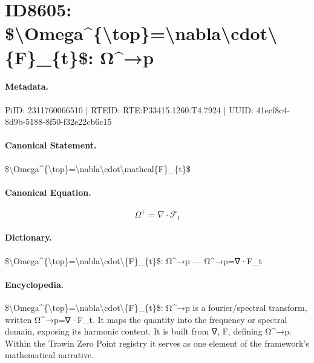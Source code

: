 \section*{ID8605: \$\textbackslash{}Omega\textasciicircum{}\{\textbackslash{}top\}=\textbackslash{}nabla\textbackslash{}cdot\textbackslash{}\{F\}\_\{t\}\$: Ω\textasciicircum{}→p}
\paragraph{Metadata.}
PiID: 2311760066510 | RTEID: RTE:P33415.1260:T4.7924 | UUID: 41ecf8c4-8d9b-5188-8f50-f32e22cb6c15

\paragraph{Canonical Statement.}
\$\textbackslash{}Omega\textasciicircum{}\{\textbackslash{}top\}=\textbackslash{}nabla\textbackslash{}cdot\textbackslash{}mathcal\{F\}\_\{t\}\$

\paragraph{Canonical Equation.}
\[
\Omega^{\top}=\nabla\cdot\mathcal{F}_{t}
\]

\paragraph{Dictionary.}
\$\textbackslash{}Omega\textasciicircum{}\{\textbackslash{}top\}=\textbackslash{}nabla\textbackslash{}cdot\textbackslash{}\{F\}\_\{t\}\$: Ω\textasciicircum{}→p — Ω\textasciicircum{}→p=∇·F\_t

\paragraph{Encyclopedia.}
\$\textbackslash{}Omega\textasciicircum{}\{\textbackslash{}top\}=\textbackslash{}nabla\textbackslash{}cdot\textbackslash{}\{F\}\_\{t\}\$: Ω\textasciicircum{}→p is a fourier/spectral transform, written Ω\textasciicircum{}→p=∇·F\_t. It maps the quantity into the frequency or spectral domain, exposing its harmonic content. It is built from ∇, F, defining Ω\textasciicircum{}→p. Within the Trawin Zero Point registry it serves as one element of the framework's mathematical narrative.
